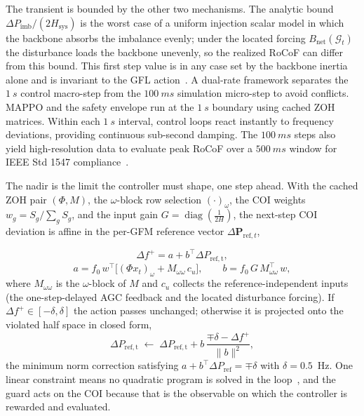 \documentclass[lettersize,journal]{IEEEtran}
\begin{document}
	The transient is bounded by the other two mechanisms. The analytic bound $\Delta P_{\mathrm{imb}}/(2H_{\mathrm{sys}})$ is the worst case of a uniform injection scalar model in which the backbone absorbs the imbalance evenly; under the located forcing $B_{\mathrm{net}}(\mathcal{G}_t)$ the disturbance loads the backbone unevenly, so the realized RoCoF can differ from this bound. This first step value is in any case set by the backbone inertia alone and is invariant to the GFL action~\cite{kenyon2021gfmfreqorder}. A dual-rate framework separates the $1~s$ control macro-step from the $100~ms$ simulation micro-step to avoid conflicts. MAPPO and the safety envelope run at the $1~s$ boundary using cached ZOH matrices. Within each $1~s$ interval, control loops react instantly to frequency deviations, providing continuous sub-second damping. The $100~ms$ steps also yield high-resolution data to evaluate peak RoCoF over a $500~ms$ window for IEEE Std 1547 compliance~\cite{8332112}.
	
	
	The nadir is the limit the controller must shape, one step ahead. With the cached ZOH pair 
	$(\Phi,M)$, the $\omega$-block row selection $(\cdot)_\omega$, the COI weights $w_g=S_g/\sum_g S_g$, and the input gain $G=\operatorname{diag}(\tfrac{1}{2H})$, the next-step COI deviation is affine in the per-GFM reference vector $\Delta\mathbf{P}_{\mathrm{ref},t}$,
	
	\begin{equation}
		\Delta f^{+}=a+b^{\!\top}\Delta P_{\mathrm{ref,t}},
		\label{eq:affine_pred}
	\end{equation}
	\begin{equation}
		a=f_0\,w^{\!\top}\!\big[(\Phi x_t)_\omega+M_{\omega\omega}\,c_u\big],
		\qquad
		b=f_0\,G\,M_{\omega\omega}^{\!\top}\,w,
		\label{eq:affine_coeffs}
	\end{equation}
	where $M_{\omega\omega}$ is the $\omega$-block of $M$ and $c_u$ collects the reference-independent inputs (the one-step-delayed AGC feedback and the located disturbance forcing). If $\Delta f^{+}\in[-\delta,\delta]$ the action passes unchanged; otherwise it is projected onto the violated half space in closed form,
	\begin{equation}
		\Delta P_{\mathrm{ref,t}}\;\leftarrow\;\Delta P_{\mathrm{ref,t}}+b\,\frac{\mp\delta-\Delta f^{+}}{\lVert b\rVert^{2}},
		\label{eq:nadir_proj}
	\end{equation}
	the minimum norm correction satisfying $a+b^{\!\top}\Delta P_{\mathrm{ref}}=\mp\delta$ with $\delta=0.5$~Hz. One linear constraint means no quadratic program is solved in the loop~\cite{tabas2021safefilter}, and the guard acts on the COI because that is the observable on which the controller is rewarded and evaluated.
	
\end{document}
